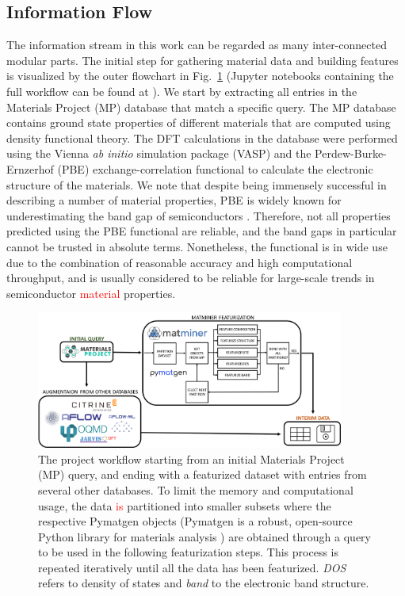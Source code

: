 \documentclass[superscriptaddress,unsortedaddress,
 amsmath,amssymb,
 aps,
]{revtex4-2}
\newcommand{\mrk}[1]{\textcolor{red}{#1}}
\begin{document}
\subsection*{Information Flow} 
The information stream in this work can be regarded as many inter-connected modular parts. 
The initial step for gathering material data and building features is visualized by the outer flowchart in Fig.~\ref{fig:flowchart} (Jupyter notebooks containing the full 
workflow can be found at \cite{Ohebbi2021}).
We start by extracting all entries in the Materials Project (MP) database  \cite{Jain2013,Jain2018} that match a specific query.  
The MP database contains ground state properties of different materials that are computed using density functional theory. The DFT calculations in the database were performed using the Vienna {\em ab initio} simulation package (VASP) \cite{Kresse1996} and the Perdew-Burke-Ernzerhof (PBE) \cite{Perdew1996} exchange-correlation functional to calculate the electronic structure of the materials. 
We note that despite being immensely successful in describing a number of material properties, PBE is widely known for underestimating the band gap of semiconductors \cite{Freysoldt2014}. Therefore, not all properties predicted using the PBE functional are reliable, and the band gaps in particular cannot be trusted in absolute terms. Nonetheless, the functional is in wide use due to the combination of reasonable accuracy and high computational throughput, and is usually considered to be reliable for large-scale trends in semiconductor \mrk{material} properties. 

\begin{figure}[t]
    \centering
    \includegraphics[width=0.9\textwidth]{figure2.png}
    \caption{The project workflow starting from an initial Materials Project (MP) query, and ending with a featurized dataset with entries from several other databases. 
    To limit the memory and computational usage, the data \mrk{is} partitioned into smaller subsets where the respective Pymatgen objects (Pymatgen is a robust, open-source Python library for materials analysis \cite{pymatgen}) are obtained through a query to be used in the following featurization steps. This process is repeated iteratively until all the data has been featurized. \emph{DOS} refers to density of states and \emph{band} to the electronic band structure. 
    }
    \label{fig:flowchart}
\end{figure}
\end{document}
